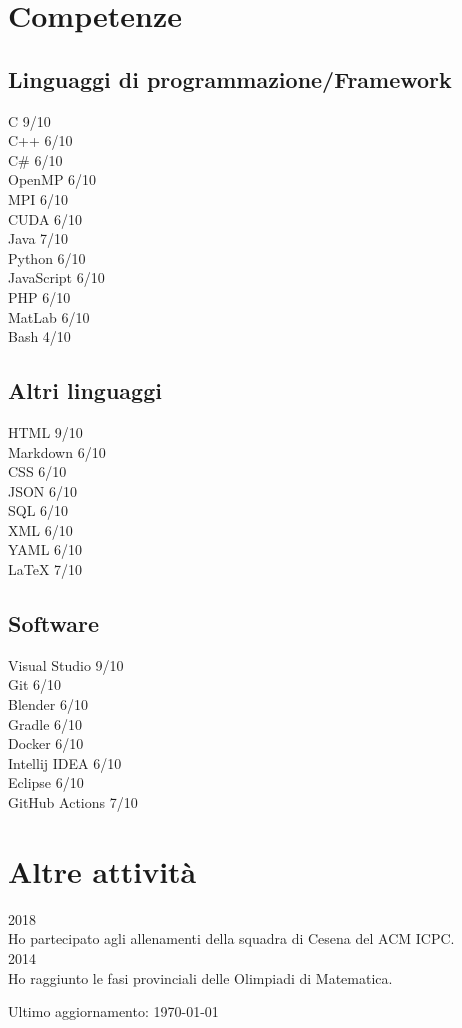 \documentclass{article}
\newcommand{\years}[1]{{\large #1}\\}
\newcommand{\skill}[2]{#1 #2/10}
\begin{document}
	
	
	
	
	
	
	
	\section*{Competenze}
	\subsection*{Linguaggi di programmazione/Framework}
	\skill{C}{9}\\
	\skill{C++}{6}\\
	\skill{C\#}{6}\\
	\skill{OpenMP}{6}\\
	\skill{MPI}{6}\\
	\skill{CUDA}{6}\\
	\skill{Java}{7}\\
	\skill{Python}{6}\\
	\skill{JavaScript}{6}\\
	\skill{PHP}{6}\\
	\skill{MatLab}{6}\\
	\skill{Bash}{4}
	
	\subsection*{Altri linguaggi}
	\skill{HTML}{9}\\
	\skill{Markdown}{6}\\
	\skill{CSS}{6}\\
	\skill{JSON}{6}\\
	\skill{SQL}{6}\\
	\skill{XML}{6}\\
	\skill{YAML}{6}\\
	\skill{\LaTeX}{7}
	
	\subsection*{Software}
	\skill{Visual Studio}{9}\\
	\skill{Git}{6}\\
	\skill{Blender}{6}\\
	\skill{Gradle}{6}\\
	\skill{Docker}{6}\\
	\skill{Intellij IDEA}{6}\\
	\skill{Eclipse}{6}\\
	\skill{GitHub Actions}{7}
	
	\section*{Altre attività}
	\years{2018} Ho partecipato agli allenamenti della squadra di Cesena del ACM ICPC.\\
	
	\years{2014} Ho raggiunto le fasi provinciali delle Olimpiadi di Matematica.
	
	\vfill
	\begin{center}
		\scriptsize
		Ultimo aggiornamento: \today
	\end{center}
	
\end{document}
